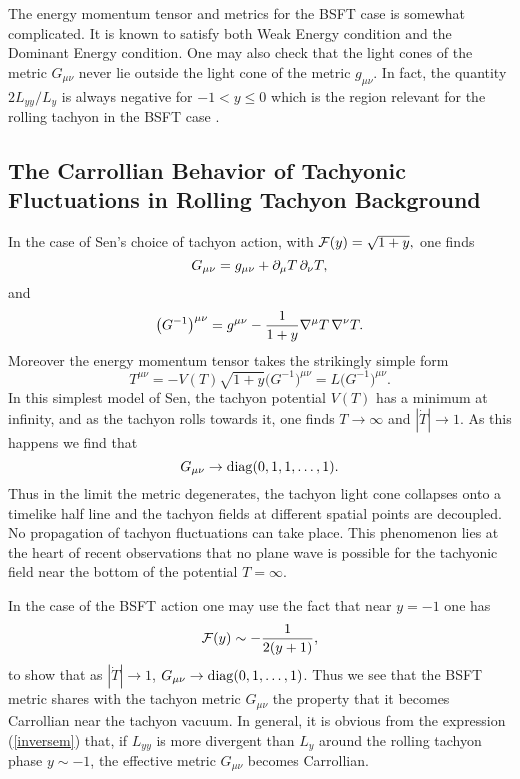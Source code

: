 \documentclass[a4paper,12pt]{article}
\begin{document}
The energy momentum tensor and metrics for the BSFT case is
somewhat complicated. It is known to satisfy both Weak Energy
condition and the Dominant  Energy condition. One may also check
that the light cones of the metric  $G_{\mu \nu}$ never lie
outside the light cone of the metric $g_{\mu \nu}$. 
In fact, the quantity $2L_{yy}/L_y$ is always negative for 
$-1< y \leq 0 $ which is the region relevant for the rolling tachyon
in the BSFT case \cite{Terashima}. 


\subsection{The Carrollian Behavior of Tachyonic
Fluctuations in Rolling Tachyon Background}


In the case of Sen's choice of tachyon action, 
with ${\cal F}(y)=\sqrt{1+y},$ 
one finds 
\begin{equation}
G_{\mu \nu} = g_{\mu \nu}  + \partial _\mu T \thinspace \partial
_\nu T, 
\end{equation} 
and 
\begin{equation} 
\bigl ( G^{-1} \bigr ) ^{\mu \nu} = g^{\mu
\nu} -\frac{1}{1+y} \nabla^\mu T \thinspace \nabla^\nu T.
 \end{equation}
Moreover the energy momentum tensor takes the
strikingly simple form 
\begin{equation} 
T^{\mu \nu} = -V(T) \sqrt {1+y} \bigl
( G^{-1} \bigr )  ^{\mu \nu}= L \bigl ( G^{-1}  \bigr ) ^{\mu \nu}
. \end{equation}
In this simplest model of Sen,
the tachyon potential $V(T)$
has a minimum at infinity, and as the tachyon rolls towards it,
one finds $T \rightarrow \infty$ and $|\dot T| \rightarrow 1$. 
As
this happens we find that 
\begin{equation} 
G_{\mu \nu} \rightarrow {\rm diag }
(0,1,1, \dots, 1 ). 
\end{equation} 
Thus in the limit the metric degenerates,
the tachyon light cone collapses onto a timelike half line and
the tachyon fields at different spatial points are decoupled. No
propagation of tachyon fluctuations can take place. 
This phenomenon lies at the heart of recent observations that
no plane wave is possible for the tachyonic field near the bottom of the 
potential $T=\infty$.

In the case of the BSFT action one may use the fact that
near $y=-1$ one has \cite{Terashima}
\begin{equation}
{\cal F}(y) \sim - \frac{1}{2(y+1)},
\label{limitt}
\end{equation}
to show that as $|\dot T| \rightarrow 1$, 
$ G_{\mu \nu} \rightarrow {\rm diag} ( 0, 1, \dots ,1)$.
Thus we see that the 
BSFT metric shares with the tachyon metric $G_{\mu \nu} $ the property
that it becomes Carrollian near the tachyon vacuum. In general, it is
obvious from the expression (\ref{inversem}) that, if $L_{yy}$ is more
divergent than $L_y$ around the rolling tachyon phase $y\sim -1$, the
effective metric $G_{\mu\nu}$ becomes Carrollian.
\end{document}
